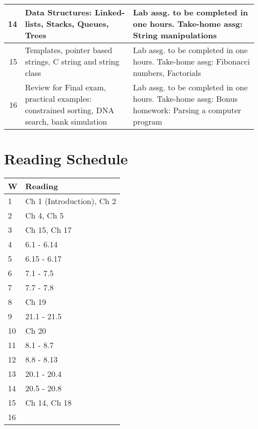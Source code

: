 \documentclass[11pt]{article}
\begin{document}
\begin{center}
\begin{tabular}{rll}
\hline
         14  &  Data Structures: Linked-lists, Stacks, Queues, Trees                                                                                  &  Lab assg. to be completed in one hours. Take-home assg: String manipulations                                                                           \\
\hline
         15  &  Templates, pointer based strings, C string and string class                                                                           &  Lab assg. to be completed in one hours. Take-home assg: Fibonacci numbers, Factorials                                                                  \\
\hline
         16  &  Review for Final exam, practical examples: constrained sorting, DNA search, bank simulation                                           &  Lab assg. to be completed in one hours. Take-home assg: Bonus homework: Parsing a computer program                                                     \\
\hline
\end{tabular}
\end{center}
\section*{Reading Schedule}
\label{sec-12}


\small

\begin{center}
\begin{tabular*}{1.0\textwidth}{|p{0.1in}|p{4.0in}|}
\hline
 \textbf{W}  &  \textbf{Reading}           \\
\hline
\hline
          1  &  Ch 1 (Introduction), Ch 2  \\
\hline
          2  &  Ch 4, Ch 5                 \\
\hline
          3  &  Ch 15, Ch 17               \\
\hline
          4  &  6.1 - 6.14                 \\
\hline
          5  &  6.15 - 6.17                \\
\hline
          6  &  7.1 - 7.5                  \\
\hline
          7  &  7.7 - 7.8                  \\
\hline
          8  &  Ch 19                      \\
\hline
          9  &  21.1 - 21.5                \\
\hline
         10  &  Ch 20                      \\
\hline
         11  &  8.1 - 8.7                  \\
\hline
         12  &  8.8 - 8.13                 \\
\hline
         13  &  20.1 - 20.4                \\
\hline
         14  &  20.5 - 20.8                \\
\hline
         15  &  Ch 14, Ch 18               \\
\hline
         16  &                             \\
\hline
\end{tabular*}
\end{center}
\end{document}
